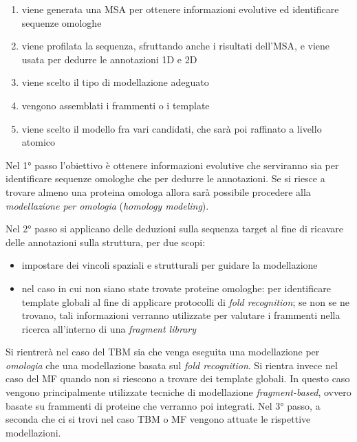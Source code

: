 {\begin{enumerate}
	\item viene generata una MSA per ottenere informazioni evolutive ed	identificare sequenze omologhe
	\item viene profilata la sequenza, sfruttando anche i risultati dell'MSA, e viene usata per dedurre le annotazioni 1D e 2D
	\item viene scelto il tipo di modellazione adeguato
	\item vengono assemblati i frammenti o i template
	\item viene scelto il modello fra vari candidati, che sarà poi raffinato a livello atomico
\end{enumerate}

\par Nel 1° passo l'obiettivo è ottenere informazioni evolutive che serviranno sia per identificare sequenze omologhe che per dedurre le annotazioni. Se si riesce a trovare almeno una proteina omologa allora sarà possibile procedere alla \textit{modellazione per omologia} (\textit{homology modeling}). \\

\par Nel 2° passo si applicano delle deduzioni sulla sequenza target al fine di ricavare delle annotazioni sulla struttura, per due scopi:
\begin{itemize}
	\item impostare dei vincoli spaziali e strutturali per guidare la modellazione
	\item nel caso in cui non siano state trovate proteine omologhe: per identificare template globali al fine di applicare protocolli di \textit{fold recognition}; se non se ne trovano, tali informazioni verranno utilizzate per valutare i frammenti nella ricerca all'interno di una \textit{fragment library}
\end{itemize}

\par Si rientrerà nel caso del TBM sia che venga eseguita una modellazione per \textit{omologia} che una modellazione basata sul \textit{fold recognition}.
Si rientra invece nel caso del MF quando non si riescono a trovare dei template globali. In questo caso vengono principalmente utilizzate tecniche di modellazione \textit{fragment-based}, ovvero basate su frammenti di proteine che verranno poi integrati. Nel 3° passo, a seconda che ci si trovi nel caso TBM o MF vengono attuate le rispettive modellazioni.\\ 

}
